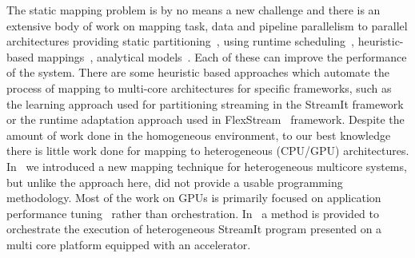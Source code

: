 \documentclass[smallextended]{svjour3}
\begin{document}
%
The static mapping problem is by no means a new challenge and there is an extensive body
of work on mapping task, data and pipeline parallelism to
parallel architectures providing static
partitioning~\cite{kwok1999static,saraswat2007x10,subhlok1993exploiting}, using runtime scheduling~\cite{distributed1984dynamic}, heuristic-based
mappings~\cite{gordon2006exploiting}, analytical models~\cite{navarro2009analytical}. Each of these can improve the performance of the system.
There are some heuristic based approaches which automate the process of mapping to multi-core architectures for specific frameworks, such as 
the learning approach used for partitioning streaming in the StreamIt framework~\cite{wang2010partitioning} or the runtime adaptation 
approach used in FlexStream~\cite{hormati2009flextream} framework.
Despite the amount of work done in the homogeneous environment, to our best knowledge there is little work done for mapping to 
heterogeneous (CPU/GPU) architectures. In~\cite{cec} we introduced a new mapping technique for heterogeneous multicore systems, 
but unlike the approach here, did not provide a usable programming methodology.
%
Most of the work on GPUs is primarily focused on application performance 
tuning~\cite{agrawal2005optimizing} rather than orchestration.
In~\cite{udupa2009software} a method is provided to orchestrate the execution of heterogeneous StreamIt program presented 
on a multi core platform equipped with an accelerator. 
%
\end{document}
